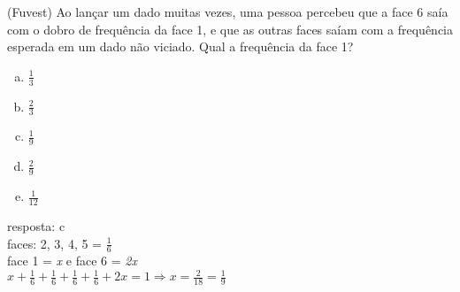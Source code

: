 \begin{ex}
 (Fuvest) Ao lançar um dado muitas vezes, uma pessoa percebeu que a face 6 saía com o dobro de frequência da face 1, e que as outras faces saíam com a frequência esperada em um dado não viciado. Qual a frequência da face 1?
    \begin{enumerate}[(a)]
    \item $\frac{1}{3}$
    \item $\frac{2}{3}$
    \item $\frac{1}{9}$
    \item $\frac{2}{9}$
    \item $\frac{1}{12}$
    \end{enumerate}
      \begin{sol}
        resposta: c \\
        faces: 2, 3, 4, 5 = $\frac{1}{6}$ \\
        face 1 = \textit{x} e face 6 = \textit{2x} \\
        $x + \frac{1}{6} +\frac{1}{6} +\frac{1}{6} +\frac{1}{6} +2x = 1 \Longrightarrow x =\frac{2}{18}=\frac{1}{9}$
      \end{sol}
\end{ex}